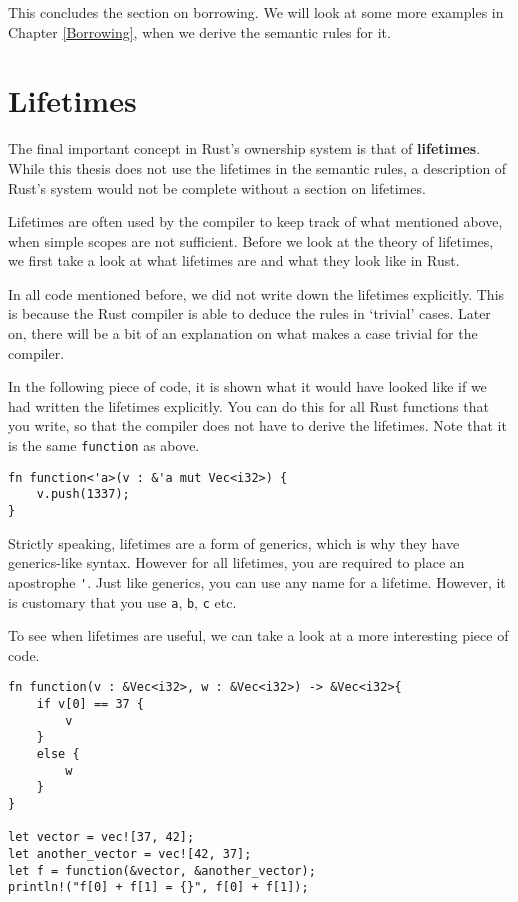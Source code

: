 This concludes the section on borrowing. We will look at some more examples in Chapter \ref{Borrowing}, when we derive the semantic rules for it. 

\section{Lifetimes}
The final important concept in Rust's ownership system is that of \textbf{lifetimes}. While this thesis does not use the lifetimes in the semantic rules, a description of Rust's system would not be complete without a section on lifetimes. 

Lifetimes are often used by the compiler to keep track of what mentioned above, when simple scopes are not sufficient. Before we look at the theory of lifetimes, we first take a look at what lifetimes are and what they look like in Rust.
 
In all code mentioned before, we did not write down the lifetimes explicitly. This is because the Rust compiler is able to deduce the rules in `trivial' cases. Later on, there will be a bit of an explanation on what makes a case trivial for the compiler.

In the following piece of code, it is shown what it would have looked like if we had written the lifetimes explicitly. You can do this for all Rust functions that you write, so that the compiler does not have to derive the lifetimes. Note that it is the same \verb|function| as above. 

\begin{verbatim}
fn function<'a>(v : &'a mut Vec<i32>) {
    v.push(1337);
}
\end{verbatim}

Strictly speaking, lifetimes are a form of generics, which is why they have generics-like syntax.  However for all lifetimes, you are required to place an apostrophe \verb|'|. Just like generics, you can use any name for a lifetime. However, it is customary that you use \verb|a|, \verb|b|, \verb|c| etc. 

To see when lifetimes are useful, we can take a look at a more interesting piece of code. 

\begin{verbatim}
fn function(v : &Vec<i32>, w : &Vec<i32>) -> &Vec<i32>{
    if v[0] == 37 {
        v
    }
    else {
        w
    }
}

let vector = vec![37, 42];
let another_vector = vec![42, 37];
let f = function(&vector, &another_vector);
println!("f[0] + f[1] = {}", f[0] + f[1]);
\end{verbatim}

